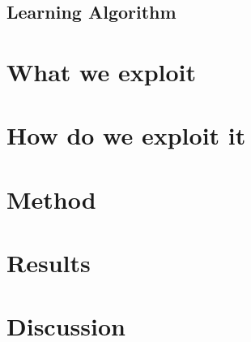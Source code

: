 \subsection{Learning Algorithm}

\section{What we exploit}

\section{How do we exploit it}

\section{Method}

\section{Results}

\section{Discussion}



